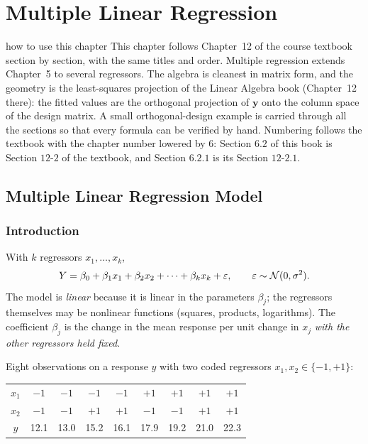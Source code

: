 \chapter{Multiple Linear Regression}

\begin{nuance}{how to use this chapter}
This chapter follows Chapter~12 of the course textbook section by section, with the same titles and order. Multiple regression extends Chapter~5 to several regressors. The algebra is cleanest in matrix form, and the geometry is the least-squares projection of the Linear Algebra book (Chapter~12 there): the fitted values are the orthogonal projection of $\mathbf{y}$ onto the column space of the design matrix. A small orthogonal-design example is carried through all the sections so that every formula can be verified by hand. Numbering follows the textbook with the chapter number lowered by $6$: Section $6.2$ of this book is Section $12$-$2$ of the textbook, and Section $6.2.1$ is its Section $12$-$2.1$.
\end{nuance}

\section{Multiple Linear Regression Model}

\subsection{Introduction}

\begin{definition}
With $k$ regressors $x_1,\dots,x_k$,
\[ Y=\beta_0+\beta_1x_1+\beta_2x_2+\dots+\beta_kx_k+\varepsilon,\qquad\varepsilon\sim\mathcal{N}(0,\sigma^2). \]
The model is \emph{linear} because it is linear in the parameters $\beta_j$; the regressors themselves may be nonlinear functions (squares, products, logarithms). The coefficient $\beta_j$ is the change in the mean response per unit change in $x_j$ \emph{with the other regressors held fixed}.
\end{definition}

\begin{example}\label{ex:mlrdata}
Eight observations on a response $y$ with two coded regressors $x_1,x_2\in\{-1,+1\}$:
\begin{center}
\begin{tabular}{c|cccccccc}
\toprule
$x_1$ & $-1$ & $-1$ & $-1$ & $-1$ & $+1$ & $+1$ & $+1$ & $+1$\\
$x_2$ & $-1$ & $-1$ & $+1$ & $+1$ & $-1$ & $-1$ & $+1$ & $+1$\\
$y$ & 12.1 & 13.0 & 15.2 & 16.1 & 17.9 & 19.2 & 21.0 & 22.3\\
\bottomrule
\end{tabular}
\end{center}
\end{example}

